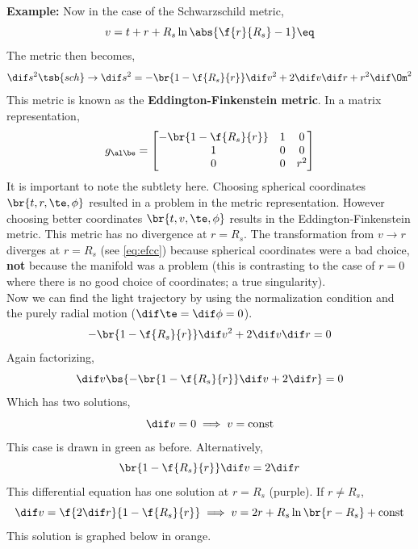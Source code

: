 \documentclass{article}
\newcommand{\mtrx}[1]{
    \begin{bmatrix}
    #1
    \end{bmatrix}
}
\begin{document}
\textbf{Example:} Now in the case of the Schwarzschild metric,
\[ v = t+r + R_s \ln \abs{\f{r}{R_s} - 1} \eq \label{eq:efcc}\]
The metric then becomes,
\[ \dif s^2\tsb{sch} \to \dif s^2 = - \br{1- \f{R_s}{r}} \dif v^2 + 2 \dif v \dif r + r^2 \dif \Om^2 \]
This metric is known as the \textbf{Eddington-Finkenstein metric}. In a matrix representation,
\[ g_{\al\be} = \mtrx{-\br{1- \f{R_s}{r}} & 1 & 0 \\1 & 0 & 0 \\0 & 0 & r^2} \]
It is important to note the subtlety here. Choosing spherical coordinates $\br{t, r, \te, \phi}$ resulted in a problem in the metric representation. However choosing better coordinates $\br{t, v, \te, \phi}$ results in the Eddington-Finkenstein metric. This metric has no divergence at $r = R_s$. The transformation from $v \to r$ diverges at $r = R_s$ (see \eqref{eq:efcc}) because spherical coordinates were a bad choice, \textbf{not} because the manifold was a problem (this is contrasting to the case of $r=0$ where there is no good choice of coordinates; a true singularity). \\

Now we can find the light trajectory by using the normalization condition and the purely radial motion ($\dif \te = \dif \phi = 0 $).
\[ - \br{1- \f{R_s}{r}}  \dif v^2 + 2 \dif v \dif r = 0 \]
Again factorizing,
\[ \dif v \bs{- \br{1- \f{R_s}{r}}  \dif v + 2 \dif r} = 0 \]
Which has two solutions,
\[ \dif v = 0 \implies v = \text{const} \]
This case is drawn in green as before. Alternatively,
\[ \br{1 - \f{R_s}{r}} \dif v = 2 \dif r \]
This differential equation has one solution at $r = R_s$ (purple). If $r \neq R_s$,
\[ \dif v = \f{2 \dif r}{ 1 - \f{R_s}{r}} \implies v = 2 r + R_s \ln\br{r - R_s} + \text{const} \]
This solution is graphed below in orange.
\begin{center}
\end{center}
\end{document}
